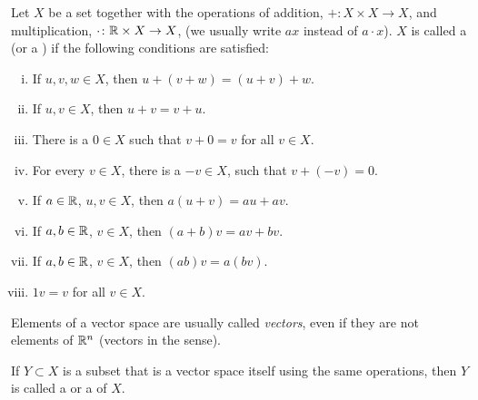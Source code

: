 \begin{defn}
Let $X$ be a set together with
the operations of addition, $+ \colon X \times X \to X$,
and multiplication, $\cdot \colon {\mathbb{R}} \times X \to X$, (we usually write $ax$ instead of $a
\cdot x$).  $X$ is called a \emph{} (or a
\emph{})
if the following conditions are satisfied:
\begin{enumerate}[(i)]
\item
If $u, v, w \in X$, then $u+(v+w) = (u+v)+w$.
\item
If $u, v \in X$, then $u+v = v+u$.
\item \label{vecspacedefn:addidentity}
There is a $0 \in X$ such that $v+0=v$ for all $v \in X$.
\item
For every $v \in X$, there is a $-v \in X$,
such that $v+(-v)=0$.
\item
If $a \in {\mathbb{R}}$, $u,v \in X$, then
$a(u+v) = au+av$.
\item
If $a,b \in {\mathbb{R}}$, $v \in X$, then
$(a+b)v = av+bv$.
\item
If $a,b \in {\mathbb{R}}$, $v \in X$, then
$(ab)v = a(bv)$.
\item
$1v = v$ for all $v \in X$.
\end{enumerate}
Elements of a vector space are usually called \emph{vectors},
even if they
are not elements of ${\mathbb{R}}^n$ (vectors in the  sense).

If $Y \subset X$ is a subset that is a vector space itself using the same
operations, then $Y$ is called a \emph{} or
a \emph{} of $X$.
\end{defn}

